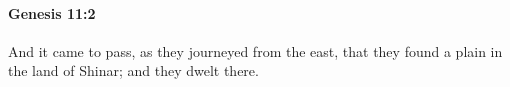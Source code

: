 
		\paragraph{Genesis 11:2} %
			\label{GENESIS-11-2}

			And it came to pass, as they journeyed from the east, that they found a plain in the land of Shinar; and they dwelt there.


